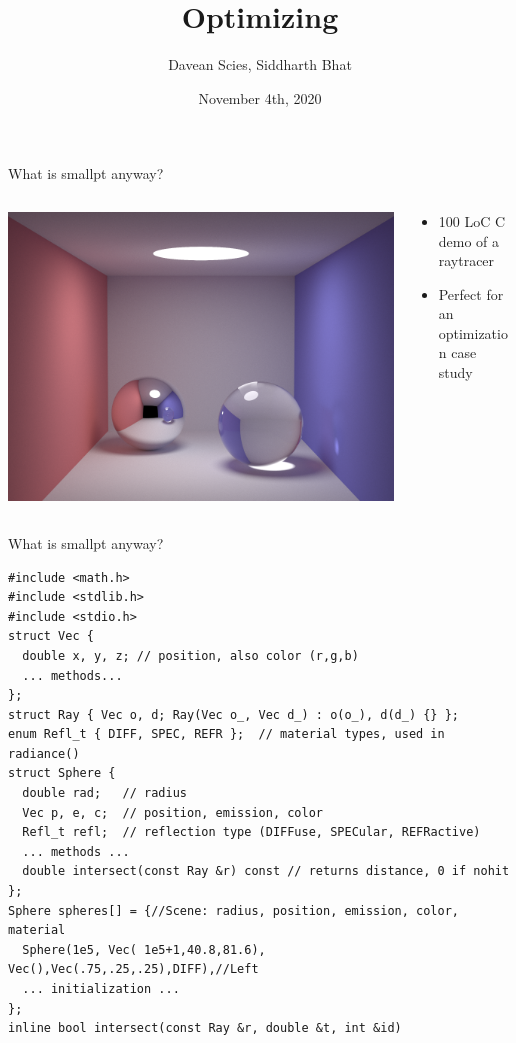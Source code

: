 \documentclass[8pt]{beamer}
\author{Davean Scies, Siddharth Bhat}
\date{November 4th, 2020}
\institute{Haskell Exchange}
\title{Optimizing \smallpt}
\begin{document}
\maketitle

\begin{frame}[fragile]{What is smallpt anyway?}
\pause
\begin{columns}
\begin{column}{0.48\textwidth}
\includegraphics[height=0.8\textwidth]{./smallpt-render.png}
\end{column}
\begin{column}{0.48\textwidth}
\pause
\begin{itemize}
\item 100 LoC C demo of a raytracer \pause
\item Perfect for an optimization case study
\end{itemize}
\end{column}
\end{columns}
\end{frame}


\begin{frame}[fragile]{What is smallpt anyway?}
\begin{verbatim}
#include <math.h>
#include <stdlib.h>
#include <stdio.h>
struct Vec {      
  double x, y, z; // position, also color (r,g,b) 
  ... methods...
}; 
struct Ray { Vec o, d; Ray(Vec o_, Vec d_) : o(o_), d(d_) {} }; 
enum Refl_t { DIFF, SPEC, REFR };  // material types, used in radiance() 
struct Sphere { 
  double rad;   // radius 
  Vec p, e, c;  // position, emission, color 
  Refl_t refl;  // reflection type (DIFFuse, SPECular, REFRactive) 
  ... methods ...
  double intersect(const Ray &r) const // returns distance, 0 if nohit 
}; 
Sphere spheres[] = {//Scene: radius, position, emission, color, material 
  Sphere(1e5, Vec( 1e5+1,40.8,81.6), Vec(),Vec(.75,.25,.25),DIFF),//Left 
  ... initialization ...
}; 
inline bool intersect(const Ray &r, double &t, int &id) 
\end{verbatim}
\end{frame}
\end{document}
